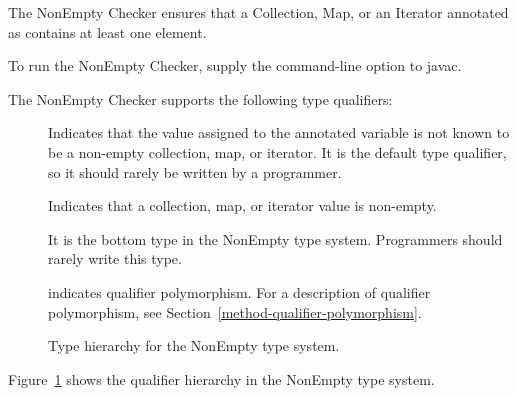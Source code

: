 \htmlhr
{}

The NonEmpty Checker ensures that a Collection, Map, or an Iterator annotated as
 contains at least one element.

To run the NonEmpty Checker, supply the
command-line option to javac.

The NonEmpty Checker supports the following type qualifiers:
\begin{description}

    \item[]
    Indicates that the value assigned to the annotated variable is not known to be a non-empty
    collection, map, or iterator. It is the default type
    qualifier, so it should rarely be written by a programmer.

    \item[]
    Indicates that a collection, map, or iterator value is non-empty.

    \item[]
    It is the bottom type in the NonEmpty type system. Programmers should rarely write this type.

    \item[]
    indicates qualifier polymorphism.
    For a description of qualifier polymorphism, see
    Section~\ref{method-qualifier-polymorphism}.

\end{description}

\begin{figure}
    \caption{Type hierarchy for the NonEmpty type system.}
    \label{fig-nonempty-hierarchy}
\end{figure}

Figure~\ref{fig-nonempty-hierarchy} shows the qualifier hierarchy in the NonEmpty type system.
